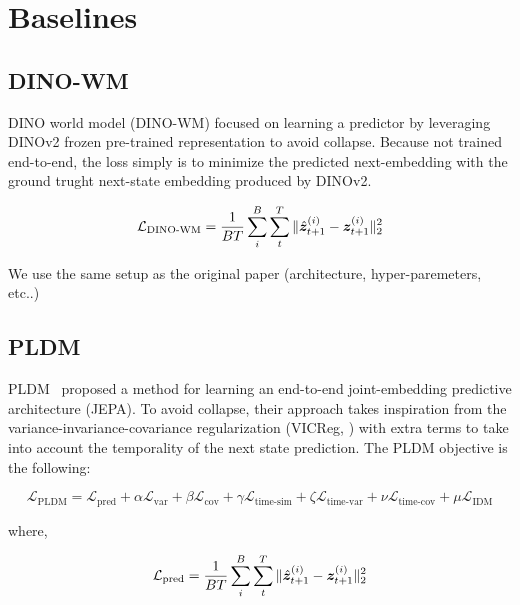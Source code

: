 \section{Baselines} \label{appendix:baselines}

\subsection{DINO-WM}

DINO world model (DINO-WM) focused on learning a predictor by leveraging DINOv2 frozen pre-trained representation to avoid collapse. Because not trained end-to-end, the loss simply is to minimize the predicted next-embedding with the ground trught next-state embedding produced by DINOv2. 

\begin{equation}
    \mathcal{L}_{\text{DINO-WM}} = \frac{1}{BT} \sum_i^B \sum_t^T \| \hat{{\bm{z}}}^{(i)}_{t+1} - {\bm{z}}^{(i)}_{t+1} \|_2^2
\end{equation}

We use the same setup as the original paper \citep{zhou2025dino-wm} (architecture, hyper-paremeters, etc..) 

\subsection{PLDM}

PLDM~\citep{sobal2025stresstesting} proposed a method for learning an end-to-end joint-embedding predictive architecture (JEPA). To avoid collapse, their approach takes inspiration from the variance-invariance-covariance regularization (VICReg, \cite{bardes2022vicreg}) with extra terms to take into account the temporality of the next state prediction. The PLDM objective is the following:

\begin{equation}
    \mathcal{L}_{\text{PLDM}} =  \mathcal{L}_{\text{pred}} +  \alpha \mathcal{L}_{\text{var}} +  \beta \mathcal{L}_{\text{cov}} +  \gamma \mathcal{L}_{\text{time-sim}} + \zeta \mathcal{L}_{\text{time-var}} + \nu \mathcal{L}_{\text{time-cov}} + \mu
    \mathcal{L}_{\text{IDM}}
\end{equation}

where,

\begin{equation*}
    \mathcal{L}_{\text{pred}} = \frac{1}{BT} \sum_i^B \sum_t^T \| \hat{{\bm{z}}}^{(i)}_{t+1} - {\bm{z}}^{(i)}_{t+1}\|_2^2
\end{equation*}

